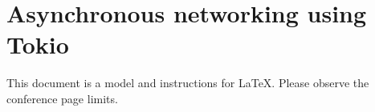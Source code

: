 
\section{Asynchronous networking using Tokio}
This document is a model and instructions for LaTeX.
Please observe the conference page limits.
